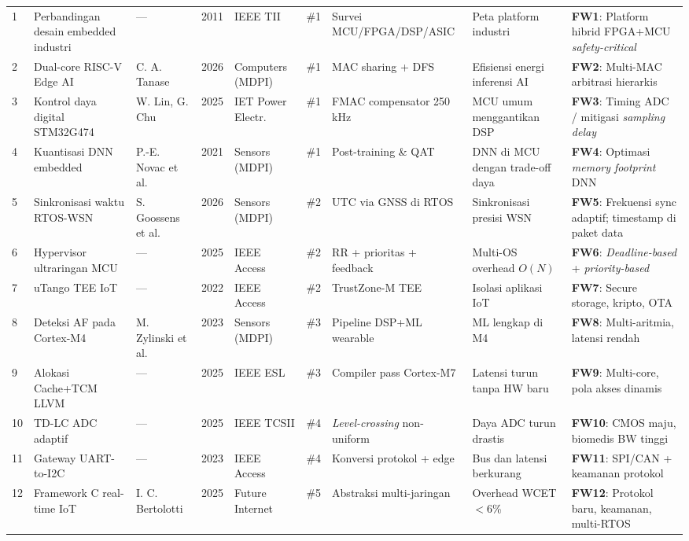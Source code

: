 \documentclass[12pt,a4paper]{article}
\begin{document}
\begin{landscape}
\begin{longtable}{@{}p{0.4cm}p{3.2cm}p{1.8cm}p{0.7cm}p{2.2cm}p{0.9cm}p{2.5cm}p{2.8cm}p{3.5cm}@{}}
1 & Perbandingan desain embedded industri & --- & 2011 & IEEE TII & \#1 & Survei MCU/FPGA/DSP/ASIC & Peta platform industri & \textbf{FW1}: Platform hibrid FPGA+MCU \textit{safety-critical} \\
2 & Dual-core RISC-V Edge AI & C. A. Tanase & 2026 & Computers (MDPI) & \#1 & MAC sharing + DFS & Efisiensi energi inferensi AI & \textbf{FW2}: Multi-MAC arbitrasi hierarkis \\
3 & Kontrol daya digital STM32G474 & W. Lin, G. Chu & 2025 & IET Power Electr. & \#1 & FMAC compensator 250\,kHz & MCU umum menggantikan DSP & \textbf{FW3}: Timing ADC / mitigasi \textit{sampling delay} \\
4 & Kuantisasi DNN embedded & P.-E. Novac et al. & 2021 & Sensors (MDPI) & \#1 & Post-training \& QAT & DNN di MCU dengan trade-off daya & \textbf{FW4}: Optimasi \textit{memory footprint} DNN \\
5 & Sinkronisasi waktu RTOS-WSN & S. Goossens et al. & 2026 & Sensors (MDPI) & \#2 & UTC via GNSS di RTOS & Sinkronisasi presisi WSN & \textbf{FW5}: Frekuensi sync adaptif; timestamp di paket data \\
6 & Hypervisor ultraringan MCU & --- & 2025 & IEEE Access & \#2 & RR + prioritas + feedback & Multi-OS overhead $O(N)$ & \textbf{FW6}: \textit{Deadline-based} + \textit{priority-based} \\
7 & uTango TEE IoT & --- & 2022 & IEEE Access & \#2 & TrustZone-M TEE & Isolasi aplikasi IoT & \textbf{FW7}: Secure storage, kripto, OTA \\
8 & Deteksi AF pada Cortex-M4 & M. Zylinski et al. & 2023 & Sensors (MDPI) & \#3 & Pipeline DSP+ML wearable & ML lengkap di M4 & \textbf{FW8}: Multi-aritmia, latensi rendah \\
9 & Alokasi Cache+TCM LLVM & --- & 2025 & IEEE ESL & \#3 & Compiler pass Cortex-M7 & Latensi turun tanpa HW baru & \textbf{FW9}: Multi-core, pola akses dinamis \\
10 & TD-LC ADC adaptif & --- & 2025 & IEEE TCSII & \#4 & \textit{Level-crossing} non-uniform & Daya ADC turun drastis & \textbf{FW10}: CMOS maju, biomedis BW tinggi \\
11 & Gateway UART-to-I2C & --- & 2023 & IEEE Access & \#4 & Konversi protokol + edge & Bus dan latensi berkurang & \textbf{FW11}: SPI/CAN + keamanan protokol \\
12 & Framework C real-time IoT & I. C. Bertolotti & 2025 & Future Internet & \#5 & Abstraksi multi-jaringan & Overhead WCET $<$6\% & \textbf{FW12}: Protokol baru, keamanan, multi-RTOS \\

\end{longtable}
\end{landscape}
\end{document}
